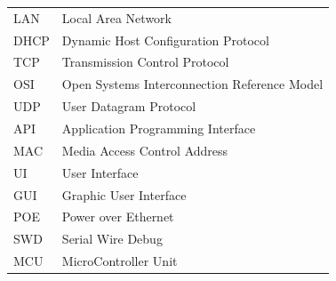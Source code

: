 \begin{tabular}{ l l }
    \hspace{1cm} LAN  & \hspace{4cm} Local Area Network \\
    \hspace{1cm} DHCP & \hspace{4cm} Dynamic Host Configuration Protocol \\
    \hspace{1cm} TCP & \hspace{4cm} Transmission Control Protocol \\
    \hspace{1cm} OSI & \hspace{4cm} Open Systems Interconnection Reference Model\\
    \hspace{1cm} UDP  & \hspace{4cm} User Datagram Protocol\\
    \hspace{1cm} API  & \hspace{4cm}  Application Programming Interface\\
    \hspace{1cm} MAC  & \hspace{4cm} Media Access Control Address\\
    \hspace{1cm} UI   & \hspace{4cm} User Interface\\
    \hspace{1cm} GUI  & \hspace{4cm} Graphic User Interface\\
    \hspace{1cm} POE  & \hspace{4cm} Power over Ethernet\\
    \hspace{1cm} SWD  & \hspace{4cm} Serial Wire Debug\\
    \hspace{1cm} MCU  & \hspace{4cm} MicroController Unit\\
    
\end{tabular}  
    \newpage

{\let\oldnumberline\numberline
    \renewcommand{\numberline}{Hình~\oldnumberline}
        \listoffigures}
\newpage

{\let\oldnumberline\numberline
    \renewcommand{\numberline}{Bảng~\oldnumberline}
        \listoftables}
